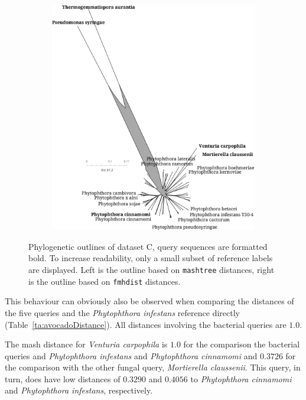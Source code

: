 \begin{figure}
\begin{subfigure}{0.49\textwidth}
    \includegraphics[width=1.0\textwidth]{figures/fmhdist_avocado4-1_k21_s2000.png}
  \end{subfigure}
  \caption{Phylogenetic outlines of dataset C, query sequences are formatted
  bold. To increase readability, only a small subset of reference labels are
  displayed. Left is the outline based on \texttt{mashtree} distances, right is
  the outline based on \texttt{fmhdist} distances.}
  \label{fig:avocadoOutlineComparison}
\end{figure}

This behaviour can obviously also be observed when comparing the distances of
the five queries and the \textit{Phytophthora infestans} reference directly
(Table~\ref{ta:avocadoDistance}). All distances involving the bacterial queries
are $1.0$.

The mash distance for \textit{Venturia carpophila} is $1.0$ for the comparison
the bacterial queries and \textit{Phytophthora infestans} and
\textit{Phytophthora cinnamomi} and $0.3726$ for the comparison with the other
fungal query, \textit{Mortierella claussenii}. This query, in turn, does have
low distances of $0.3290$ and $0.4056$ to \textit{Phytophthora cinnamomi} and
\textit{Phytophthora infestans}, respectively.


